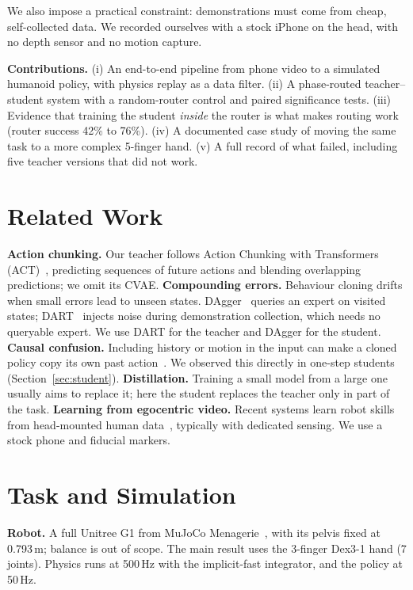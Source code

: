 \documentclass[10pt,twocolumn]{article}
\begin{document}
We also impose a practical constraint: demonstrations must come from cheap, self-collected data. We recorded
ourselves with a stock iPhone on the head, with no depth sensor and no motion capture.

\textbf{Contributions.}
(i) An end-to-end pipeline from phone video to a simulated humanoid policy, with physics replay as a data filter.
(ii) A phase-routed teacher--student system with a random-router control and paired significance tests.
(iii) Evidence that training the student \emph{inside} the router is what makes routing work (router success 42\% to 76\%).
(iv) A documented case study of moving the same task to a more complex 5-finger hand.
(v) A full record of what failed, including five teacher versions that did not work.

\section{Related Work}
\textbf{Action chunking.} Our teacher follows Action Chunking with Transformers (ACT)~\cite{act}, predicting
sequences of future actions and blending overlapping predictions; we omit its CVAE.
\textbf{Compounding errors.} Behaviour cloning drifts when small errors lead to unseen states. DAgger~\cite{dagger}
queries an expert on visited states; DART~\cite{dart} injects noise during demonstration collection, which needs no
queryable expert. We use DART for the teacher and DAgger for the student.
\textbf{Causal confusion.} Including history or motion in the input can make a cloned policy copy its own past
action~\cite{causalconfusion,copycat}. We observed this directly in one-step students (Section~\ref{sec:student}).
\textbf{Distillation.} Training a small model from a large one~\cite{distill} usually aims to replace it; here the
student replaces the teacher only in part of the task.
\textbf{Learning from egocentric video.} Recent systems learn robot skills from head-mounted human
data~\cite{egomimic,dexcap}, typically with dedicated sensing. We use a stock phone and fiducial markers.

\section{Task and Simulation}
\textbf{Robot.} A full Unitree G1 from MuJoCo Menagerie~\cite{mujoco,menagerie}, with its pelvis fixed at 0.793\,m;
balance is out of scope. The main result uses the 3-finger Dex3-1 hand (7 joints). Physics runs at 500\,Hz with the
implicit-fast integrator, and the policy at 50\,Hz.
\end{document}
